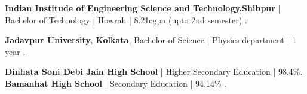 %
%
%



\begin{scholarship}
					{\textbf{Indian Institude of Engineering Science and Technology,Shibpur} | Bachelor of Technology | Howrah | 8.21cgpa (upto 2nd semester) .}
				
					{\textbf{Jadavpur University, Kolkata}, Bachelor of Science | Physics department | 1 year .}
					
					{\textbf{Dinhata Soni Debi Jain High School} | Higher Secondary Education | 98.4\%.}
					{\textbf{Bamanhat High School} | Secondary Education | 94.14\% .}
	
\end{scholarship}